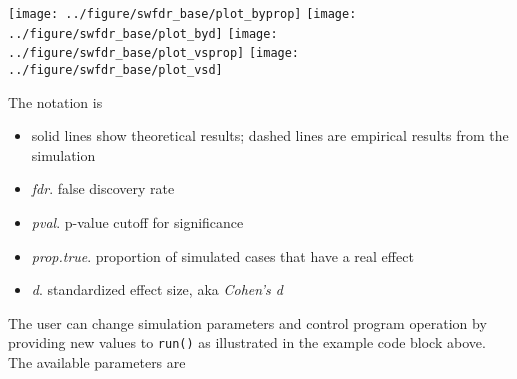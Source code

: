\documentclass[]{article}
\providecommand{\tightlist}{%
  \setlength{\itemsep}{0pt}\setlength{\parskip}{0pt}}
\begin{document}
\texttt{[image: ../figure/swfdr\_base/plot\_byprop]}
\texttt{[image: ../figure/swfdr\_base/plot\_byd]}
\texttt{[image: ../figure/swfdr\_base/plot\_vsprop]}
\texttt{[image: ../figure/swfdr\_base/plot\_vsd]}

The notation is

\begin{itemize}
\tightlist
\item
  solid lines show theoretical results; dashed lines are empirical
  results from the simulation
\item
  \emph{fdr}. false discovery rate
\item
  \emph{pval}. p-value cutoff for significance
\item
  \emph{prop.true}. proportion of simulated cases that have a real
  effect
\item
  \emph{d}. standardized effect size, aka \emph{Cohen's d}
\end{itemize}

The user can change simulation parameters and control program operation
by providing new values to \texttt{run()} as illustrated in the example
code block above. The available parameters are
\end{document}

